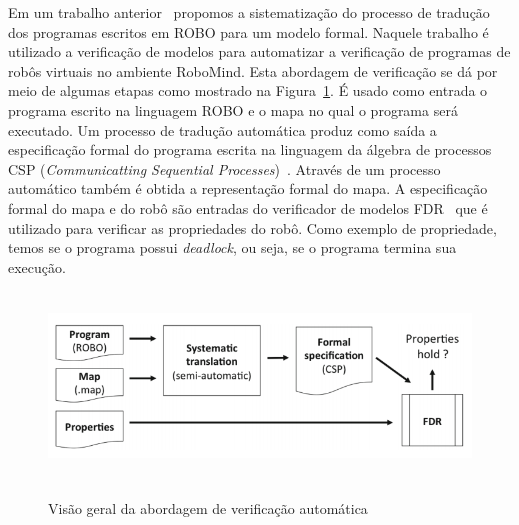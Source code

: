 
Em um trabalho anterior~\cite{nogueira} propomos a sistematização do processo de tradução dos programas escritos em ROBO para um modelo formal. Naquele trabalho é utilizado a verificação de modelos para automatizar a verificação de programas de robôs virtuais no ambiente RoboMind. Esta abordagem de verificação se dá por meio de algumas etapas como mostrado na Figura~\ref{fig:fluxograma}. É usado como entrada o programa escrito na linguagem ROBO e o mapa no qual o programa será executado. Um processo de tradução automática produz como saída a especificação formal do programa escrita na linguagem da álgebra de processos CSP (\textit{Communicatting Sequential Processes})~\cite{Cleaveland2018}. Através de um processo automático também é obtida a representação formal do mapa. A especificação formal do mapa e do robô são entradas do verificador de modelos FDR~\cite{Gibson} que é utilizado para verificar as propriedades do robô. Como exemplo de propriedade, temos se o programa possui \textit{deadlock}, ou seja, se o programa termina sua execução. 

\begin{figure}[h]
\centering
\caption{Visão geral da abordagem de verificação automática}
\includegraphics[height=5cm]{figuras/approach_workflow.png}
\label{fig:fluxograma}
\end{figure} 


